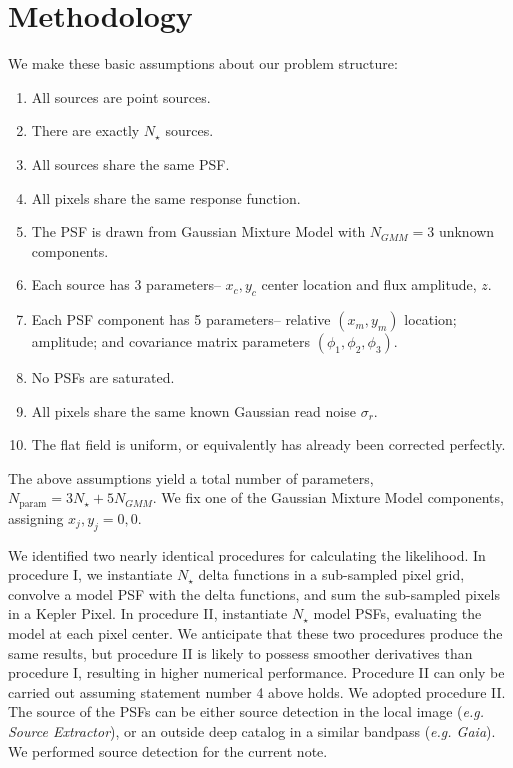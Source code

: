 \documentclass{rnaastex}
\begin{document}
\section{Methodology}
We make these basic assumptions about our problem structure:

\begin{enumerate}
  \item All sources are point sources.
  \item There are exactly $N_{\star}$ sources.
  \item All sources share the same PSF.
  \item All pixels share the same response function.
  \item The PSF is drawn from Gaussian Mixture Model with $N_{GMM} = 3$ unknown components.
  \item Each source has 3 parameters-- $x_c, y_c$ center location and flux amplitude, $z$.
  \item Each PSF component has 5 parameters-- relative $(x_m, y_m)$ location; amplitude; and covariance matrix parameters $(\phi_1, \phi_2, \phi_3)$.
  \item No PSFs are saturated.
  \item All pixels share the same known Gaussian read noise $\sigma_{r}$.
  \item The flat field is uniform, or equivalently has already been corrected perfectly.
\end{enumerate}

The above assumptions yield a total number of parameters, $N_{\mathrm{param}} = 3 N_\star + 5N_{GMM}$.  We fix one of the Gaussian Mixture Model components, assigning $x_j,y_j = 0,0 $.

We identified two nearly identical procedures for calculating the likelihood.  In procedure I, we instantiate $N_\star$ delta functions in a sub-sampled pixel grid, convolve a model PSF with the delta functions, and sum the sub-sampled pixels in a Kepler Pixel.  In procedure II, instantiate $N_\star$ model PSFs, evaluating the model at each pixel center.  We anticipate that these two procedures produce the same results, but procedure II is likely to possess smoother derivatives than procedure I, resulting in higher numerical performance.  Procedure II can only be carried out assuming statement number 4 above holds.  We adopted procedure II.  The source of the PSFs can be either source detection in the local image (\emph{e.g. Source Extractor}), or an outside deep catalog in a similar bandpass (\emph{e.g. Gaia}).  We performed source detection for the current note.
\end{document}

